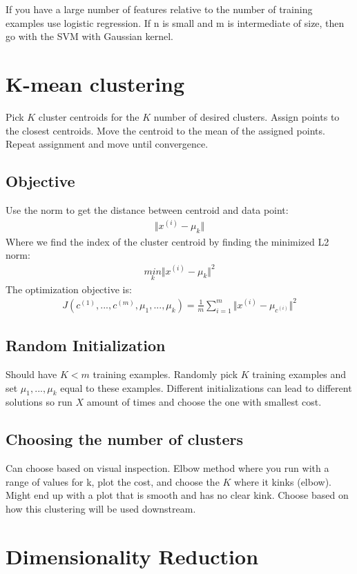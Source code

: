 \documentclass[12pt]{article}
\begin{document}
 If you have a large number of features relative to the number of training examples use logistic regression. If n is small and m is intermediate of size, then go with the SVM with Gaussian kernel.
 
\section{K-mean clustering}
Pick $K$ cluster centroids for the $K$ number of desired clusters. Assign points to the closest centroids. Move the centroid to the mean of the assigned points. Repeat assignment and move until convergence. 

\subsection{Objective}
Use the norm to get the distance between centroid and data point:
\begin{align*}
	\Vert x^{(i)} - \mu_k\Vert
\end{align*}
Where we find the index of the cluster centroid by finding the minimized L2 norm:
\begin{align*}
	\underset{k}{min}\Vert x^{(i)} - \mu_k\Vert^2
\end{align*}
The optimization objective is:
\begin{align*}
J(c^{(1)},...,c^{(m)},\mu_1,...,\mu_k) = \frac{1}{m}\sum_{i=1}^{m}\Vert x^{(i)} - \mu_{c^(i)}\Vert^2
\end{align*}

\subsection{Random Initialization}
Should have $K<m$ training examples. Randomly pick $K$ training examples and set $\mu_1,...,\mu_k$ equal to these examples. Different initializations can lead to different solutions so run $X$ amount of times and choose the one with smallest cost.

\subsection{Choosing the number of clusters}
Can choose based on visual inspection. Elbow method where you run with a range of values for k, plot the cost, and choose the $K$ where it kinks (elbow). Might end up with a plot that is smooth and has no clear kink. Choose based on how this clustering will be used downstream.

\section{Dimensionality Reduction}
\end{document}
